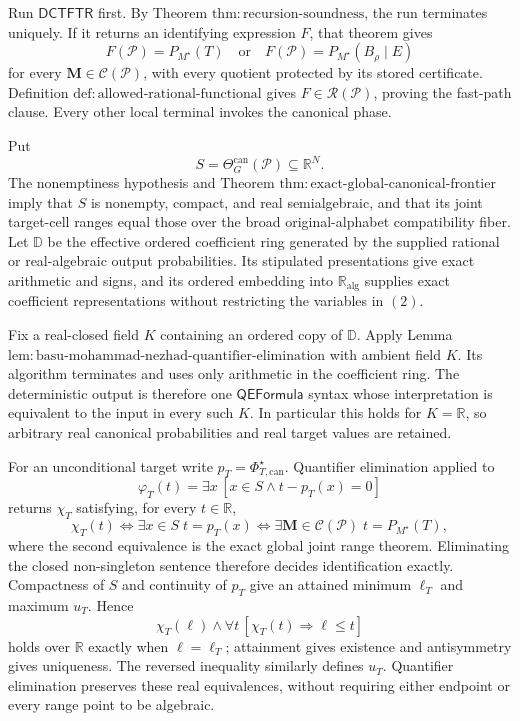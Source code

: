 Run \(\mathsf{DCTFTR}\) first.  By Theorem \(\mathrm{thm:recursion\text{-}soundness}\), the run terminates uniquely.  If it returns an identifying expression \(F\), that theorem gives
\[
F(\mathcal P)=P_{M^\star}(T)
\quad\text{or}\quad
F(\mathcal P)=P_{M^\star}(B_\rho\mid E)
\tag{1}
\]
for every \(\mathbf M\in\mathcal C(\mathcal P)\), with every quotient protected by its stored certificate.  Definition \(\mathrm{def:allowed\text{-}rational\text{-}functional}\) gives \(F\in\mathscr R(\mathcal P)\), proving the fast-path clause.  Every other local terminal invokes the canonical phase.

Put
\[
S=\Theta_G^{\mathrm{can}}(\mathcal P)\subseteq\mathbb R^N.
\tag{2}
\]
The nonemptiness hypothesis and Theorem \(\mathrm{thm:exact\text{-}global\text{-}canonical\text{-}frontier}\) imply that \(S\) is nonempty, compact, and real semialgebraic, and that its joint target-cell ranges equal those over the broad original-alphabet compatibility fiber.  Let \(\mathbb D\) be the effective ordered coefficient ring generated by the supplied rational or real-algebraic output probabilities.  Its stipulated presentations give exact arithmetic and signs, and its ordered embedding into \(\mathbb R_{\mathrm{alg}}\) supplies exact coefficient representations without restricting the variables in \((2)\).

Fix a real-closed field \(K\) containing an ordered copy of \(\mathbb D\).  Apply Lemma \(\mathrm{lem:basu\text{-}mohammad\text{-}nezhad\text{-}quantifier\text{-}elimination}\) with ambient field \(K\).  Its algorithm terminates and uses only arithmetic in the coefficient ring.  The deterministic output is therefore one \(\mathsf{QEFormula}\) syntax whose interpretation is equivalent to the input in every such \(K\).  In particular this holds for \(K=\mathbb R\), so arbitrary real canonical probabilities and real target values are retained.

For an unconditional target write \(p_T=\Phi_{T,\mathrm{can}}^\star\).  Quantifier elimination applied to
\[
\varphi_T(t)=\exists x\,[x\in S\wedge t-p_T(x)=0]
\tag{3}
\]
returns \(\chi_T\) satisfying, for every \(t\in\mathbb R\),
\[
\chi_T(t)\Longleftrightarrow
\exists x\in S\;t=p_T(x)
\Longleftrightarrow
\exists\mathbf M\in\mathcal C(\mathcal P)\;
t=P_{M^\star}(T),
\tag{4}
\]
where the second equivalence is the exact global joint range theorem.  Eliminating the closed non-singleton sentence therefore decides identification exactly.  Compactness of \(S\) and continuity of \(p_T\) give an attained minimum \(\ell_T\) and maximum \(u_T\).  Hence
\[
\chi_T(\ell)\wedge\forall t\,[\chi_T(t)\Longrightarrow\ell\leq t]
\tag{5}
\]
holds over \(\mathbb R\) exactly when \(\ell=\ell_T\); attainment gives existence and antisymmetry gives uniqueness.  The reversed inequality similarly defines \(u_T\).  Quantifier elimination preserves these real equivalences, without requiring either endpoint or every range point to be algebraic.

